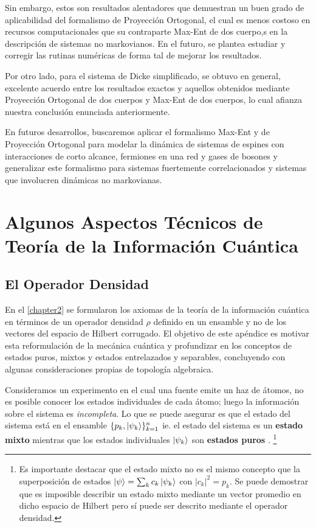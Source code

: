 \documentclass{report} %
\numberwithin{equation}{section}
\begin{document}
Sin embargo, estos son resultados alentadores que demuestran un buen grado de aplicabilidad del formalismo de Proyección Ortogonal, el cual es menos costoso en recursos computacionales que su contraparte Max-Ent de dos cuerpo,s en la descripción de sistemas no markovianos. En el futuro, se plantea estudiar y corregir las rutinas numéricas de forma tal de mejorar los resultados.

Por otro lado, para el sistema de Dicke simplificado, se obtuvo en general, excelente acuerdo entre los resultados exactos y aquellos obtenidos mediante Proyección Ortogonal de dos cuerpos y Max-Ent de dos cuerpos, lo cual afianza nuestra conclusión enunciada anteriormente. 

En futuros desarrollos, buscaremos aplicar el formalismo Max-Ent y de Proyección Ortogonal para modelar la dinámica de sistemas de espines con interacciones de corto alcance, fermiones en una red y gases de bosones y generalizar este formalismo para  sistemas fuertemente correlacionados y sistemas que involucren dinámicas no markovianas.

\appendix

\chapter{Algunos Aspectos Técnicos de Teoría de la Informaci\'on Cu\'antica}
\label{Appendix A}
\section{El Operador Densidad}

En el \autoref{chapter2} se formularon los axiomas de la teoría de la información cuántica en términos de un operador densidad $\rho$ definido en un ensamble y no de los vectores del espacio de Hilbert corrugado. El objetivo de este apéndice es motivar esta reformulación de la mecánica cuántica y profundizar en los conceptos de estados puros, mixtos y estados entrelazados y separables, concluyendo con algunas consideraciones propias de topología algebraica.  

Consideramos un experimento en el cual una fuente emite un haz de átomos, no es posible conocer los estados individuales de cada átomo; luego la información sobre el sistema es \textit{incompleta}. Lo que se puede asegurar es que el estado del sistema está en el ensamble  $\{p_k, \ket{\psi_k}\}_{k=1}^{n}$ ie. el estado del sistema es un \textbf{estado mixto} mientras que los estados individuales $\ket{\psi_k}$ son \textbf{estados puros} \cite{B.C.G.STR, Nielsen.00}. \footnote{Es importante destacar que el estado mixto no es el mismo concepto que la superposición de estados $\ket{\psi} = \sum_{k} c_k \ket{\psi_k}$ con $|c_k|^2 = p_k$. Se puede demostrar que es imposible describir un estado mixto mediante un vector promedio en dicho espacio de Hilbert pero sí puede ser descrito mediante el operador densidad.}
\end{document}
